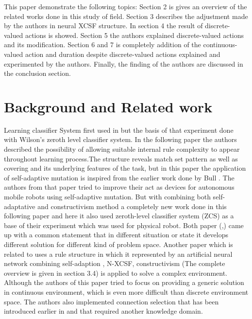 \documentclass[12pt]{article}
\begin{document}
This paper demonstrate the following topics:  Section 2 is gives an overview of the related works done in this study of field. Section 3 describes the adjustment made by the authors in neural XCSF structure. In section 4 the result of discrete-valued actions is showed. Section 5 the authors explained discrete-valued actions and its modification. Section 6 and 7 is completely addition of the continuous-valued action and duration despite discrete-valued actions explained and experimented by the authors. Finally, the finding of the authors are discussed in the conclusion section.


\section{Background and Related work}
\label{sec:meth}
Learning classifier System first used in \cite{10.1007/3-540-45712-7_54} but the basis of that experiment done with Wilson’s zeroth level classifier system. In the following paper the authors described the possibility of allowing suitable internal rule complexity to appear throughout learning process.The structure reveals match set pattern as well as covering and its underlying features of the task, but in this paper  the application of self-adaptive mutation is inspired from the earlier work done by Bull \cite{111111111}. The authors from that paper \cite{111111111} tried to improve their act as devices for autonomous mobile robots using self-adaptive mutation. But with combining both self-adaptative and constructivism method a completely new work done in this following paper \cite{10.1145/1389095.1389364} and here it also used zeroth-level classifier system (ZCS) as a base of their experiment which was used for physical robot. Both paper (\cite{doi:10.1162/artl.2006.12.3.353},\cite{10.1007/3-540-45712-7_57}) came up with a common statement that in different situation or state it develops different solution for different kind of problem space. Another paper which is related to \cite{10.1145/1389095.1389364} uses a rule structure in which it represented by an artificial neural network combining self-adaption \cite{111111111}, N-XCSF, constructivism \cite{quartz_sejnowski_1997} (The complete overview is given in section 3.4) is applied to solve a complex environment. Although the authors of this paper tried to focus on providing a generic solution in continuous environment, which is even more difficult than discrete environment space. The authors also implemented connection selection that has been introduced earlier in \cite{10.1145/1388969.1389010} and that required another knowledge domain.
\end{document}
